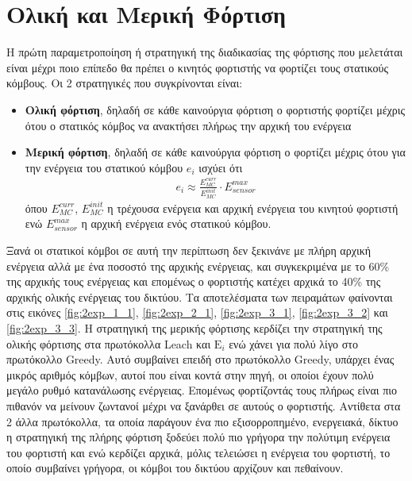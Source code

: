 \section{Ολική και Μερική Φόρτιση}\label{sc:result2}
Η πρώτη παραμετροποίηση ή στρατηγική της διαδικασίας της φόρτισης που μελετάται είναι μέχρι ποιο επίπεδο θα πρέπει ο κινητός φορτιστής να φορτίζει τους στατικούς
κόμβους. Οι 2 στρατηγικές που συγκρίνονται είναι:
\begin{itemize}
  \item \textbf{Oλική φόρτιση}, δηλαδή σε κάθε καινούργια φόρτιση ο φορτιστής φορτίζει μέχρις ότου ο στατικός κόμβος να ανακτήσει πλήρως την αρχική του ενέργεια
  \item \textbf{Μερική φόρτιση}, δηλαδή σε κάθε καινούργια φόρτιση ο φορτίζει μέχρις ότου για την ενέργεια του στατικού κόμβου $e_{i}$ ισχύει ότι
\begin{align*}
e_{i} \approx \frac{E^{curr}_{MC}}{E^{init}_{MC}}\cdot E^{max}_{sensor}
\end{align*}
όπου $E^{curr}_{MC}$, $E^{init}_{MC}$ η τρέχουσα ενέργεια και αρχική ενέργεια του κινητού φορτιστή ενώ $E^{max}_{sensor}$ η αρχική ενέργεια ενός στατικού κόμβου.
\end{itemize}
Ξανά οι στατικοί κόμβοι σε αυτή την περίπτωση δεν ξεκινάνε με πλήρη αρχική ενέργεια αλλά με ένα ποσοστό της αρχικής ενέργειας, και συγκεκριμένα
με το 60\% της αρχικής τους ενέργειας και επομένως ο φορτιστής κατέχει αρχικά το 40\% της αρχικής ολικής ενέργειας του δικτύου. Τα αποτελέσματα των πειραμάτων
φαίνονται στις εικόνες \ref{fig:2exp_1_1}, \ref{fig:2exp_2_1}, \ref{fig:2exp_3_1}, \ref{fig:2exp_3_2} και \ref{fig:2exp_3_3}. Η στρατηγική της μερικής φόρτισης
κερδίζει την στρατηγική της ολικής φόρτισης στα πρωτόκολλα Leach και $\text{E}_{i}$ ενώ χάνει για πολύ λίγο στο πρωτόκολλο Greedy. Αυτό συμβαίνει επειδή στο
πρωτόκολλο Greedy, υπάρχει ένας μικρός αριθμός κόμβων, αυτοί που είναι κοντά στην πηγή, οι οποίοι έχουν πολύ μεγάλο ρυθμό κατανάλωσης ενέργειας. Επομένως
φορτίζοντάς τους πλήρως είναι πιο πιθανόν να μείνουν ζωντανοί μέχρι να ξανάρθει σε αυτούς ο φορτιστής. Αντίθετα στα 2 άλλα πρωτόκολλα, τα οποία παράγουν ένα πιο
εξισορροπημένο, ενεργειακά, δίκτυο η στρατηγική της πλήρης φόρτιση ξοδεύει πολύ πιο γρήγορα την πολύτιμη ενέργεια του φορτιστή και ενώ κερδίζει αρχικά, μόλις
τελειώσει η ενέργεια του φορτιστή, το οποίο συμβαίνει γρήγορα, οι κόμβοι του δικτύου αρχίζουν και πεθαίνουν.


